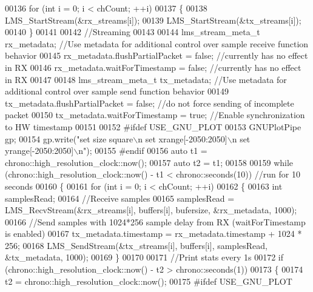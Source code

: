 \begin{DoxyCode}
00136     \textcolor{keywordflow}{for} (\textcolor{keywordtype}{int} i = 0; i < chCount; ++i)
00137     \{
00138         LMS_StartStream(&rx\_streams[i]);
00139         LMS_StartStream(&tx\_streams[i]);
00140     \}
00141 
00142     \textcolor{comment}{//Streaming}
00143 
00144     lms_stream_meta_t rx\_metadata; \textcolor{comment}{//Use metadata for additional control over sample receive function
       behavior}
00145     rx\_metadata.flushPartialPacket = \textcolor{keyword}{false}; \textcolor{comment}{//currently has no effect in RX}
00146     rx\_metadata.waitForTimestamp = \textcolor{keyword}{false}; \textcolor{comment}{//currently has no effect in RX}
00147 
00148     lms_stream_meta_t tx\_metadata; \textcolor{comment}{//Use metadata for additional control over sample send function behavior}
00149     tx\_metadata.flushPartialPacket = \textcolor{keyword}{false}; \textcolor{comment}{//do not force sending of incomplete packet}
00150     tx\_metadata.waitForTimestamp = \textcolor{keyword}{true}; \textcolor{comment}{//Enable synchronization to HW timestamp}
00151 
00152 \textcolor{preprocessor}{#ifdef USE\_GNU\_PLOT}
00153     GNUPlotPipe gp;
00154     gp.write(\textcolor{stringliteral}{"set size square\(\backslash\)n set xrange[-2050:2050]\(\backslash\)n set yrange[-2050:2050]\(\backslash\)n"});
00155 \textcolor{preprocessor}{#endif}
00156     \textcolor{keyword}{auto} t1 = chrono::high\_resolution\_clock::now();
00157     \textcolor{keyword}{auto} t2 = t1;
00158 
00159     \textcolor{keywordflow}{while} (chrono::high\_resolution\_clock::now() - t1 < chrono::seconds(10)) \textcolor{comment}{//run for 10 seconds}
00160     \{
00161         \textcolor{keywordflow}{for} (\textcolor{keywordtype}{int} i = 0; i < chCount; ++i)
00162         \{
00163             \textcolor{keywordtype}{int} samplesRead;
00164             \textcolor{comment}{//Receive samples}
00165             samplesRead = LMS_RecvStream(&rx\_streams[i], buffers[i], bufersize, &rx\_metadata, 1000);
00166             \textcolor{comment}{//Send samples with 1024*256 sample delay from RX (waitForTimestamp is enabled)}
00167             tx\_metadata.timestamp = rx\_metadata.timestamp + 1024 * 256;
00168             LMS_SendStream(&tx\_streams[i], buffers[i], samplesRead, &tx\_metadata, 1000);
00169         \}
00170 
00171         \textcolor{comment}{//Print stats every 1s}
00172         \textcolor{keywordflow}{if} (chrono::high\_resolution\_clock::now() - t2 > chrono::seconds(1))
00173         \{
00174             t2 = chrono::high\_resolution\_clock::now();
00175 \textcolor{preprocessor}{#ifdef USE\_GNU\_PLOT}

\end{DoxyCode}
